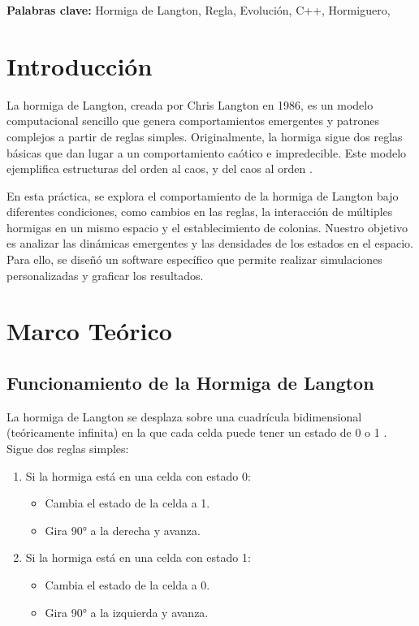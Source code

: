 \documentclass[12pt,twoside]{article}
\newcommand{\keywords}[1]{%
	\begin{center}
		\textbf{Palabras clave:} #1
	\end{center}
}
\begin{document}
	\keywords{Hormiga de Langton, Regla, Evolución, C++, Hormiguero,}
	
	\clearpage
	
	\tableofcontents
	\clearpage
	
	\clearpage
	\section{Introducción}
	
	La hormiga de Langton, creada por Chris Langton en 1986, es un modelo computacional sencillo que genera comportamientos emergentes y patrones complejos a partir de reglas simples. Originalmente, la hormiga sigue dos reglas básicas que dan lugar a un comportamiento caótico e impredecible. Este modelo ejemplifica estructuras del orden al caos, y del caos al orden \cite{bib:lan1}.
	
	En esta práctica, se explora el comportamiento de la hormiga de Langton bajo diferentes condiciones, como cambios en las reglas, la interacción de múltiples hormigas en un mismo espacio y el establecimiento de colonias. Nuestro objetivo es analizar las dinámicas emergentes y las densidades de los estados en el espacio. Para ello, se diseñó un software específico que permite realizar simulaciones personalizadas y graficar los resultados.
	
	\section{Marco Teórico}
	
	\subsection{Funcionamiento de la Hormiga de Langton}
	
	La hormiga de Langton se desplaza sobre una cuadrícula bidimensional (teóricamente infinita) en la que cada celda puede tener un estado de 0 o 1 \cite{bib:lan2}. Sigue dos reglas simples:  
	\begin{enumerate}
		\item Si la hormiga está en una celda con estado 0:
		\begin{itemize}
			\item Cambia el estado de la celda a 1.
			\item Gira 90° a la derecha y avanza.
		\end{itemize}
		\item Si la hormiga está en una celda con estado 1:
		\begin{itemize}
			\item Cambia el estado de la celda a 0.
			\item Gira 90° a la izquierda y avanza.
		\end{itemize}
	\end{enumerate}
	
\end{document}

